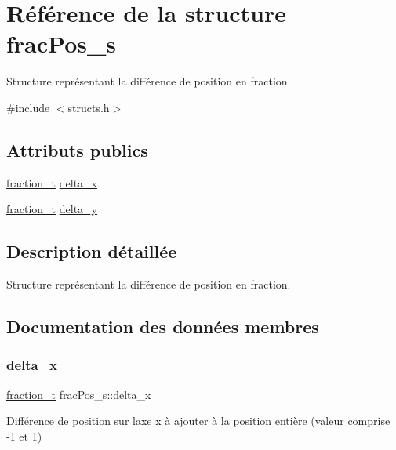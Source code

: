 \hypertarget{structfrac_pos__s}{}\section{Référence de la structure frac\+Pos\+\_\+s}
\label{structfrac_pos__s}


Structure représentant la différence de position en fraction.  




{\ttfamily \#include $<$structs.\+h$>$}

\subsection*{Attributs publics}
\begin{DoxyCompactItemize}
\item 
\hyperlink{structfraction__s}{fraction\+\_\+t} \hyperlink{structfrac_pos__s_ac62e5ff2d9cda05e685fc9a0465cd17d}{delta\+\_\+x}
\item 
\hyperlink{structfraction__s}{fraction\+\_\+t} \hyperlink{structfrac_pos__s_aff1b19a8e4e258da47ab4e5bd309a935}{delta\+\_\+y}
\end{DoxyCompactItemize}


\subsection{Description détaillée}
Structure représentant la différence de position en fraction. 

\subsection{Documentation des données membres}
\mbox{\label{structfrac_pos__s_ac62e5ff2d9cda05e685fc9a0465cd17d}} 
\subsubsection{\texorpdfstring{delta\+\_\+x}{delta\_x}}
{\footnotesize\ttfamily \hyperlink{structfraction__s}{fraction\+\_\+t} frac\+Pos\+\_\+s\+::delta\+\_\+x}

Différence de position sur l\textquotesingle{}axe x à ajouter à la position entière (valeur comprise -\/1 et 1) \mbox{\label{structfrac_pos__s_aff1b19a8e4e258da47ab4e5bd309a935}} 
